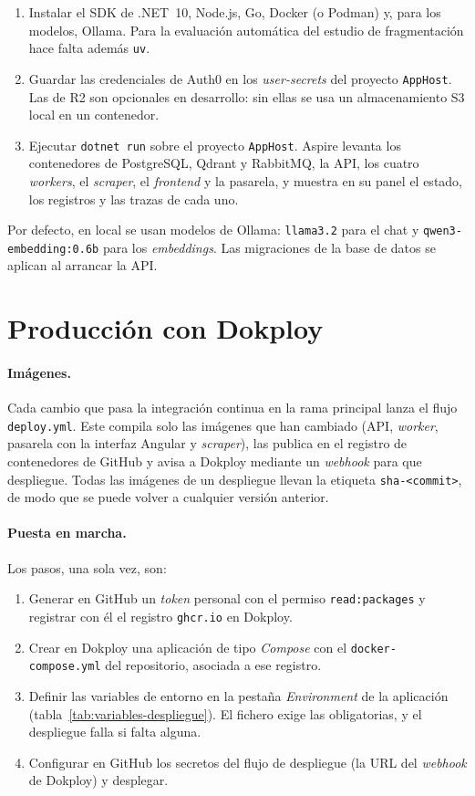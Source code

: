 \begin{enumerate}
  \item Instalar el SDK de .NET~10, Node.js, Go, Docker (o Podman) y, para los modelos, Ollama. Para la evaluación automática del estudio de fragmentación hace falta además \texttt{uv}.
  \item Guardar las credenciales de Auth0 en los \emph{user-secrets} del proyecto \texttt{AppHost}. Las de R2 son opcionales en desarrollo: sin ellas se usa un almacenamiento S3 local en un contenedor.
  \item Ejecutar \texttt{dotnet run} sobre el proyecto \texttt{AppHost}. Aspire levanta los contenedores de PostgreSQL, Qdrant y RabbitMQ, la API, los cuatro \emph{workers}, el \emph{scraper}, el \emph{frontend} y la pasarela, y muestra en su panel el estado, los registros y las trazas de cada uno.
\end{enumerate}

Por defecto, en local se usan modelos de Ollama: \texttt{llama3.2} para el chat y \texttt{qwen3-\allowbreak embedding:0.6b} para los \emph{embeddings}. Las migraciones de la base de datos se aplican al arrancar la API.

\section{Producción con Dokploy}

\paragraph{Imágenes.} Cada cambio que pasa la integración continua en la rama principal lanza el flujo \texttt{deploy.yml}. Este compila solo las imágenes que han cambiado (API, \emph{worker}, pasarela con la interfaz Angular y \emph{scraper}), las publica en el registro de contenedores de GitHub y avisa a Dokploy mediante un \emph{webhook} para que despliegue. Todas las imágenes de un despliegue llevan la etiqueta \texttt{sha-<commit>}, de modo que se puede volver a cualquier versión anterior.

\paragraph{Puesta en marcha.} Los pasos, una sola vez, son:

\begin{enumerate}
  \item Generar en GitHub un \emph{token} personal con el permiso \texttt{read:packages} y registrar con él el registro \texttt{ghcr.io} en Dokploy.
  \item Crear en Dokploy una aplicación de tipo \emph{Compose} con el \texttt{docker-compose.yml} del repositorio, asociada a ese registro.
  \item Definir las variables de entorno en la pestaña \emph{Environment} de la aplicación (tabla~\ref{tab:variables-despliegue}). El fichero exige las obligatorias, y el despliegue falla si falta alguna.
  \item Configurar en GitHub los secretos del flujo de despliegue (la URL del \emph{webhook} de Dokploy) y desplegar.
\end{enumerate}

